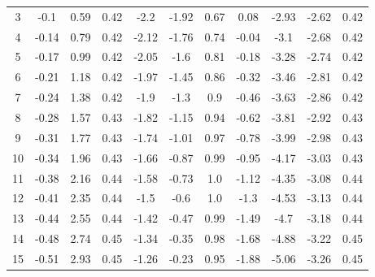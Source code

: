 \begin{table}
{\begin{tabular}{c|cc|cccccccc}
3 & -0.1 & 0.59 & 0.42 & -2.2 & -1.92 & 0.67 & 0.08 & -2.93 & -2.62 & 0.42 \\ 
4 & -0.14 & 0.79 & 0.42 & -2.12 & -1.76 & 0.74 & -0.04 & -3.1 & -2.68 & 0.42 \\ 
5 & -0.17 & 0.99 & 0.42 & -2.05 & -1.6 & 0.81 & -0.18 & -3.28 & -2.74 & 0.42 \\ 
6 & -0.21 & 1.18 & 0.42 & -1.97 & -1.45 & 0.86 & -0.32 & -3.46 & -2.81 & 0.42 \\ 
7 & -0.24 & 1.38 & 0.42 & -1.9 & -1.3 & 0.9 & -0.46 & -3.63 & -2.86 & 0.42 \\ 
8 & -0.28 & 1.57 & 0.43 & -1.82 & -1.15 & 0.94 & -0.62 & -3.81 & -2.92 & 0.43 \\ 
9 & -0.31 & 1.77 & 0.43 & -1.74 & -1.01 & 0.97 & -0.78 & -3.99 & -2.98 & 0.43 \\ 
10 & -0.34 & 1.96 & 0.43 & -1.66 & -0.87 & 0.99 & -0.95 & -4.17 & -3.03 & 0.43 \\ 
11 & -0.38 & 2.16 & 0.44 & -1.58 & -0.73 & 1.0 & -1.12 & -4.35 & -3.08 & 0.44 \\ 
12 & -0.41 & 2.35 & 0.44 & -1.5 & -0.6 & 1.0 & -1.3 & -4.53 & -3.13 & 0.44 \\ 
13 & -0.44 & 2.55 & 0.44 & -1.42 & -0.47 & 0.99 & -1.49 & -4.7 & -3.18 & 0.44 \\ 
14 & -0.48 & 2.74 & 0.45 & -1.34 & -0.35 & 0.98 & -1.68 & -4.88 & -3.22 & 0.45 \\ 
15 & -0.51 & 2.93 & 0.45 & -1.26 & -0.23 & 0.95 & -1.88 & -5.06 & -3.26 & 0.45 \\ 


\end{tabular}
}
\end{table}

